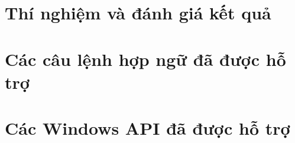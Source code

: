 \section{Thí nghiệm và đánh giá kết quả}

\section{Các câu lệnh hợp ngữ đã được hỗ trợ}

\section{Các Windows API đã được hỗ trợ}